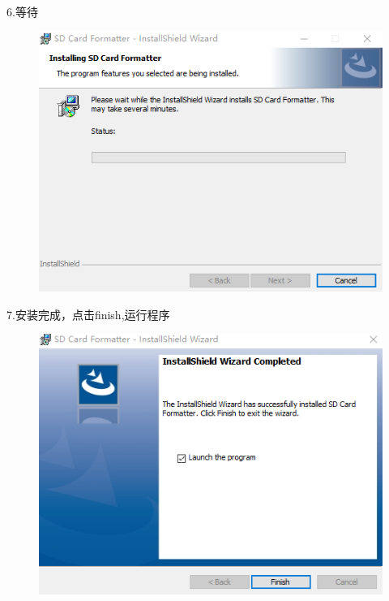\documentclass[openbib]{article}
\begin{document}
6.等待
\begin{figure}[H]
	\centering
	\includegraphics[scale=0.35]{a7}
\end{figure}

7.安装完成，点击finish,运行程序
\begin{figure}[H]
	\centering
	\includegraphics[scale=0.35]{a8}
\end{figure}
\end{document}
